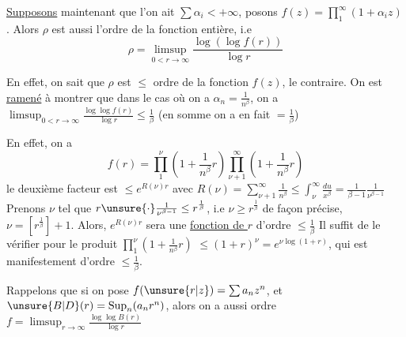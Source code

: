 \uline{Supposons} maintenant que l'on ait $\sum\alpha_i<+\infty$,
posons $f(z)=\prod_1^\infty(1+\alpha_i z)$. Alors $\rho$ est aussi
l'ordre de la fonction entière, i.e
\[ \rho=\limsup_{0<r\to\infty}\frac{\log(\log f(r))}{\log r} \]

En effet, on sait que $\rho$ est $\leq$ ordre de la
fonction $f(z)$,   le contraire. On est
\uline{ramené} à montrer que   dans le
cas où on a $\alpha_n=\frac1{n^\beta}$, on a
$\displaystyle \limsup_{0<r\to\infty}\frac{\log\log f(r)}{\log r}\leq\frac1\beta$ \quad (en somme on a en fait $=\frac1\beta$)

En effet, on a
\[ f(r)=\prod_1^\nu\left(1+\frac1{n^\beta}r\right)\prod_{\nu+1}^{\infty}\left(1+\frac1{n^\beta}r\right) \]
le deuxième facteur est $\leq e^{R(\nu)r}$
avec $\displaystyle R(\nu)=\sum_{\nu+1}^\infty\frac1{n^\beta}\leq\int_\nu^\infty\frac{du}{x^\beta}=\frac1{\beta-1}\frac1{\nu^{\beta-1}}$
Prenons $\nu$ tel que $r\unsure{\cdot}\frac1{\nu^{\beta-1}}\leq r^{\frac1\beta}$, i.e $\nu\geq r^{\frac1\beta}$
de façon précise, $\nu=[r^{\frac1\beta}]+1$. Alors, $e^{R(\nu)r}$
sera une \uline{fonction de $r$} d'ordre $\leq\frac1\beta$ Il
suffit de le vérifier pour le produit $\prod_1^\nu(1+\frac1{n^\beta}r)$
$\leq(1+r)^\nu=e^{\nu\log(1+r)}$, qui est manifestement
d'ordre $\leq\frac1\beta$.

Rappelons que si on pose $f(\unsure{r|z})=\sum a_n z^n$,
 et $\unsure{B|D}(r)=\mathop{\rm Sup}_n(a_n r^n)$, alors on
a aussi \qquad ordre  $f=\limsup_{r\to\infty}\frac{\log\log B(r)}{\log r}$
